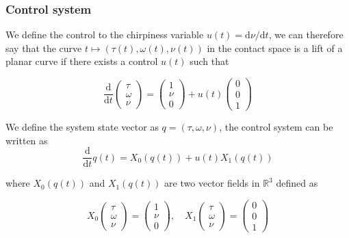 \documentclass[
  american,
]{article}
\begin{document}
\hypertarget{control-system}{%
\subsubsection{Control system}\label{control-system}}

We define the control to the chirpiness variable \(u(t)=\mathrm{d}\nu/\mathrm{d}t\),
we can therefore say that the curve \(t\mapsto(\tau(t),\omega(t),\nu(t))\)
in the contact space is a lift of a planar curve if there exists
a control \(u(t)\) such that

\begin{equation}
\frac{\mathrm{d}}{\mathrm{d}t}\begin{pmatrix}\tau\\\omega\\\nu\end{pmatrix} = \begin{pmatrix}1\\\nu\\0\end{pmatrix} + u(t)\begin{pmatrix}0\\0\\1\end{pmatrix}
\end{equation}

We define the system state vector as \(q=(\tau,\omega,\nu)\), the control system
can be written as
\begin{equation}
\frac{\mathrm{d}}{\mathrm{d}t}q(t) = X_0(q(t)) + u(t) X_1(q(t))
\end{equation}

where \(X_0(q(t))\) and \(X_1(q(t))\) are two vector fields in \(\mathbb{R}^3\) defined as

\begin{equation}
X_0\begin{pmatrix}\tau\\\omega\\\nu\end{pmatrix} = \begin{pmatrix}1\\\nu\\0\end{pmatrix},\quad 
X_1\begin{pmatrix}\tau\\\omega\\\nu\end{pmatrix} = \begin{pmatrix}0\\0\\1\end{pmatrix}
\end{equation}
\end{document}
